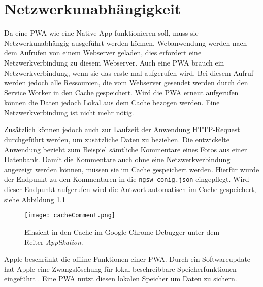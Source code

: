 \chapter{Netzwerkunabhängigkeit}

Da eine PWA wie eine Native-App funktionieren soll, muss sie Netzwerkunabhängig ausgeführt werden können. Webanwendung werden nach dem Aufrufen von einem Webserver geladen, dies erfordert eine Netzwerkverbindung zu diesem Webserver. Auch eine PWA brauch ein Netzwerkverbindung, wenn sie das erste mal aufgerufen wird. Bei diesem Aufruf werden jedoch alle Ressourcen, die vom Webserver gesendet werden durch den Service Worker in den Cache gespeichert. 
Wird die PWA erneut aufgerufen können die Daten jedoch Lokal aus dem Cache bezogen werden. Eine Netzwerkverbindung ist nicht mehr nötig. 

Zusätzlich können jedoch auch zur Laufzeit der Anwendung HTTP-Request durchgeführt werden, um zusätzliche Daten zu beziehen. Die entwickelte Anwendung bezieht zum Beispiel sämtliche Kommentare eines Fotos aus einer Datenbank. 
Damit die Kommentare auch ohne eine Netzwerkverbindung angezeigt werden können, müssen sie im Cache gespeichert werden. Hierfür wurde der Endpunkt zu den Kommentaren in die \texttt{ngsw-conig.json} eingepflegt. 
Wird dieser Endpunkt aufgerufen wird die Antwort automatisch im Cache gespeichert, siehe Abbildung \ref{img:cacheComment}

\begin{figure}[!htb]
    \centering
    \texttt{[image: cacheComment.png]}
    \caption{Einsicht in den Cache im Google Chrome Debugger unter dem Reiter \textit{Applikation}.}
    \label{img:cacheComment}
\end{figure}

Apple beschränkt die offline-Funktionen einer PWA. Durch ein Softwareupdate hat Apple eine Zwangslöschung für lokal beschreibbare Speicherfunktionen eingeführt \cite{t3n2020}. Eine PWA nutzt diesen lokalen Speicher um Daten zu sichern.